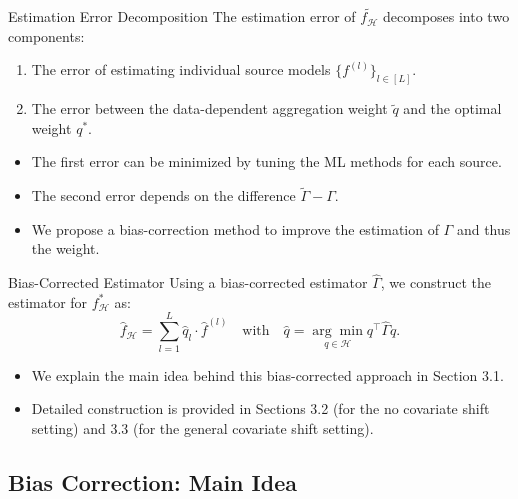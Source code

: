 \documentclass{beamer}
\begin{document}
\begin{frame}{Estimation Error Decomposition}
    The estimation error of $\widetilde{f_{\mathcal{H}}}$ decomposes into two components:
    \begin{enumerate}
        \item The error of estimating individual source models $\{ f^{(l)} \}_{l \in [L]}$.
        \item The error between the data-dependent aggregation weight $\widetilde{q}$ and the optimal weight $q^{*}$.
    \end{enumerate}
    \begin{itemize}
        \item The first error can be minimized by tuning the ML methods for each source.
        \item The second error depends on the difference $\widetilde{\Gamma} - \Gamma$.
        \item We propose a bias-correction method to improve the estimation of $\Gamma$ and thus the weight.
    \end{itemize}
\end{frame}

\begin{frame}{Bias-Corrected Estimator}
    Using a bias-corrected estimator $\widehat{\Gamma}$, we construct the estimator for $f_{\mathcal{H}}^{*}$ as:
    \begin{equation*}
        \widehat{f}_{\mathcal{H}} = \sum_{l = 1}^{L} \widehat{q}_{l} \cdot \widehat{f}^{(l)} \quad \text{with} \quad \widehat{q} = \underset{q \in \mathcal{H}}{\arg \min} q^{\intercal} \widehat{\Gamma} q. \tag{3.2}
    \end{equation*}
    \begin{itemize}
        \item We explain the main idea behind this bias-corrected approach in Section 3.1.
        \item Detailed construction is provided in Sections 3.2 (for the no covariate shift setting) and 3.3 (for the general covariate shift setting).
    \end{itemize}
\end{frame}

\subsection{Bias Correction: Main Idea}
\end{document}
